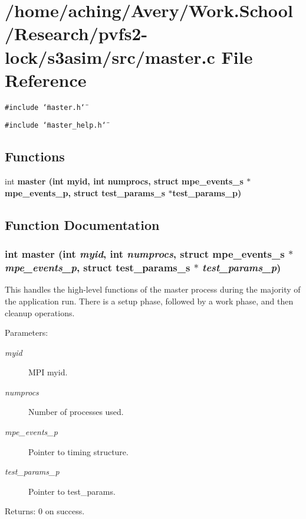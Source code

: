 \section{/home/aching/Avery/Work.School/Research/pvfs2-lock/s3asim/src/master.c File Reference}
\label{master_8c}
{\tt \#include \char`\"{}master.h\char`\"{}}\par
{\tt \#include \char`\"{}master\_\-help.h\char`\"{}}\par
\subsection*{Functions}
\begin{CompactItemize}
\item 
int \bf{master} (int myid, int numprocs, struct \bf{mpe\_\-events\_\-s} $\ast$mpe\_\-events\_\-p, struct \bf{test\_\-params\_\-s} $\ast$test\_\-params\_\-p)
\end{CompactItemize}


\subsection{Function Documentation}
\subsubsection{\setlength{\rightskip}{0pt plus 5cm}int master (int {\em myid}, int {\em numprocs}, struct \bf{mpe\_\-events\_\-s} $\ast$ {\em mpe\_\-events\_\-p}, struct \bf{test\_\-params\_\-s} $\ast$ {\em test\_\-params\_\-p})}\label{master_8c_c390bba10a532460b92d0cd37778087a}


This handles the high-level functions of the master process during the majority of the application run. There is a setup phase, followed by a work phase, and then cleanup operations.

\begin{Desc}
\item[Parameters:]
\begin{description}
\item[{\em myid}]MPI myid. \item[{\em numprocs}]Number of processes used. \item[{\em mpe\_\-events\_\-p}]Pointer to timing structure. \item[{\em test\_\-params\_\-p}]Pointer to test\_\-params. \end{description}
\end{Desc}
\begin{Desc}
\item[Returns:]0 on success. \end{Desc}
